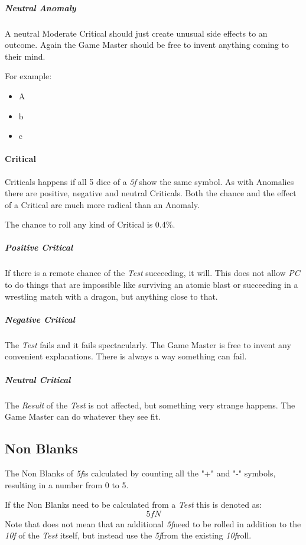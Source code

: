 \subparagraph{Neutral Anomaly}
A neutral Moderate Critical should just create unusual side effects to an outcome.
Again the Game Master should be free to invent anything coming to their mind.

For example:
\begin{itemize}[parsep=0em]
    \item A
    \item b
    \item c
\end{itemize}

\paragraph{Critical}
Criticals happens if all 5 dice of a \emph{5f} show the same symbol. As with Anomalies
there are positive, negative and neutral Criticals. Both the chance and the effect of
a Critical are much more radical than an Anomaly.

The chance to roll any kind of Critical is 0.4\%.

\subparagraph{Positive Critical}

If there is a remote chance of the \emph{Test} succeeding, it will. This does not
allow \emph{PC} to do things that are impossible like surviving an atomic blast or
succeeding in a wrestling match with a dragon, but anything close to that.

\subparagraph{Negative Critical}

The \emph{Test} fails and it fails spectacularly. The Game Master is free to invent
any convenient explanations. There is always a way something can fail.

\subparagraph{Neutral Critical}

The \emph{Result} of the \emph{Test} is not affected, but something very strange
happens. The Game Master can do whatever they see fit.


\subsection{Non Blanks}

The Non Blanks of \emph{5f}is calculated by counting all the "+" and "-" symbols,
resulting in a number from 0 to 5.

If the Non Blanks need to be calculated from a \emph{Test} this is denoted as:
\[ \textit{5fN} \]
Note that does not mean that an additional \emph{5f}need to be rolled in addition to
the \emph{10f} of the \emph{Test} itself, but instead use the \emph{5f}from the
existing \emph{10f}roll.

